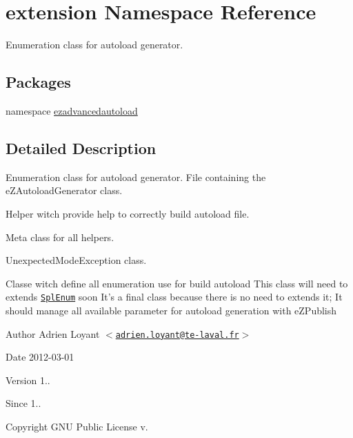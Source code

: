 \hypertarget{namespaceextension}{\section{extension \-Namespace \-Reference}
\label{namespaceextension}
}


\-Enumeration class for autoload generator.  


\subsection*{\-Packages}
\begin{DoxyCompactItemize}
\item 
namespace \hyperlink{namespaceextension_1_1ezadvancedautoload}{ezadvancedautoload}
\end{DoxyCompactItemize}


\subsection{\-Detailed \-Description}
\-Enumeration class for autoload generator. \-File containing the e\-Z\-Autoload\-Generator class.

\-Helper witch provide help to correctly build autoload file.

\-Meta class for all helpers.

\-Unexpected\-Mode\-Exception class.

\-Classe witch define all enumeration use for build autoload \-This class will need to extends \href{http://php.net/manual/fr/book.spl-types.php}{\tt \-Spl\-Enum} soon \-It's a final class because there is no need to extends it; \-It should manage all available parameter for autoload generation with e\-Z\-Publish

\begin{DoxyAuthor}{\-Author}
\-Adrien \-Loyant $<$\href{mailto:adrien.loyant@te-laval.fr}{\tt adrien.\-loyant@te-\/laval.\-fr}$>$
\end{DoxyAuthor}
\begin{DoxyDate}{\-Date}
2012-\/03-\/01 
\end{DoxyDate}
\begin{DoxyVersion}{\-Version}
1.. 
\end{DoxyVersion}
\begin{DoxySince}{\-Since}
1.. 
\end{DoxySince}
\begin{DoxyCopyright}{\-Copyright}
\-G\-N\-U \-Public \-License v.
\end{DoxyCopyright}



